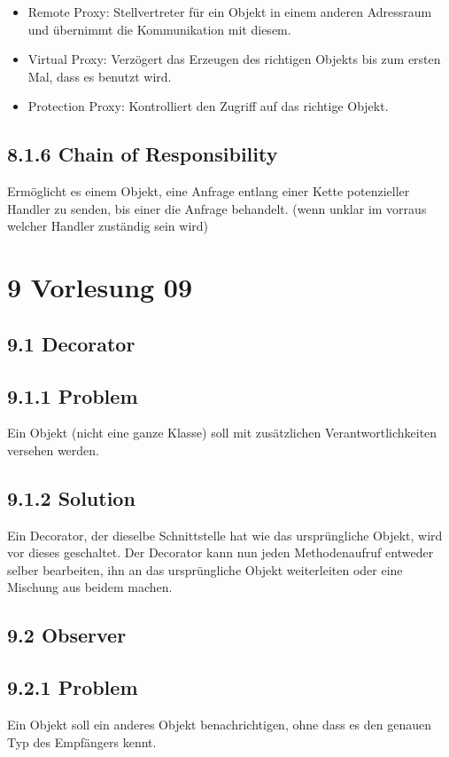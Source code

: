 \documentclass[10pt]{article}
\begin{document}
\begin{itemize}
  \item Remote Proxy: Stellvertreter für ein Objekt in einem anderen Adressraum und übernimmt die Kommunikation mit diesem.
  \item Virtual Proxy: Verzögert das Erzeugen des richtigen Objekts bis zum ersten Mal, dass es benutzt wird.
  \item Protection Proxy: Kontrolliert den Zugriff auf das richtige Objekt.
\end{itemize}

\subsection*{8.1.6 Chain of Responsibility}
Ermöglicht es einem Objekt, eine Anfrage entlang einer Kette potenzieller Handler zu senden, bis einer die Anfrage behandelt. (wenn unklar im vorraus welcher Handler zuständig sein wird)

\section*{9 Vorlesung 09}
\subsection*{9.1 Decorator}
\subsection*{9.1.1 Problem}
Ein Objekt (nicht eine ganze Klasse) soll mit zusätzlichen Verantwortlichkeiten versehen werden.

\subsection*{9.1.2 Solution}
Ein Decorator, der dieselbe Schnittstelle hat wie das ursprüngliche Objekt, wird vor dieses geschaltet. Der Decorator kann nun jeden Methodenaufruf entweder selber bearbeiten, ihn an das ursprüngliche Objekt weiterleiten oder eine Mischung aus beidem machen.

\subsection*{9.2 Observer}
\subsection*{9.2.1 Problem}
Ein Objekt soll ein anderes Objekt benachrichtigen, ohne dass es den genauen Typ des Empfängers kennt.
\end{document}
